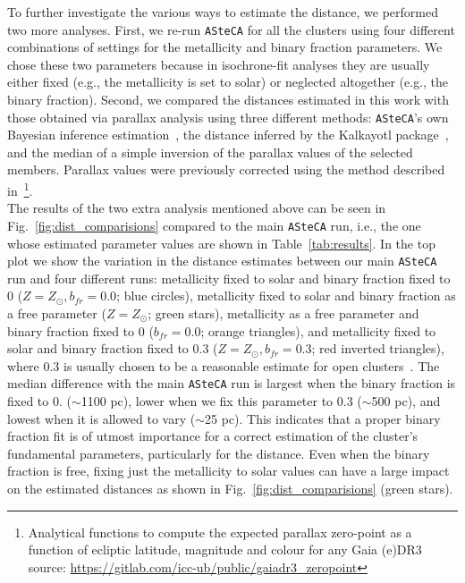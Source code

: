 \documentclass[draft]{aa}
\begin{document}
  To further investigate the various ways to estimate the distance, we performed
  two more analyses. First, we re-run \texttt{ASteCA} for all the
  clusters using four different combinations of settings for the metallicity and
  binary fraction parameters. We chose these two parameters because in
  isochrone-fit analyses they are usually either fixed (e.g., the metallicity is
  set to solar) or neglected altogether (e.g., the binary fraction).
  Second, we compared the distances estimated in this work with those obtained
  via parallax analysis using three different methods: \texttt{ASteCA}'s own
  Bayesian inference estimation~\citep[described in][]{Perren_2020}, the
  distance inferred by the Kalkayotl package~\citep{Kalkayotl}, and the median
  of a simple inversion of the parallax values of the selected members.
  Parallax values were previously corrected using the method described
  in~\cite{Lindegren_2021}\footnote{ Analytical functions to compute the
  expected parallax zero-point as a function of ecliptic latitude, magnitude and
  colour for any Gaia (e)DR3
  source: \url{https://gitlab.com/icc-ub/public/gaiadr3_zeropoint}}.\\

  The results of the two extra analysis mentioned above can be seen in
  Fig.~\ref{fig:dist_comparisions} compared to the main \texttt{ASteCA} run,
  i.e., the one whose estimated parameter values are shown in
  Table~\ref{tab:results}.
  In the top plot we show the variation in the distance estimates between our
  main \texttt{ASteCA} run and four different runs: metallicity fixed to solar
  and binary fraction fixed to 0 ($Z=Z_{\odot},b_{fr}=0.0$; blue circles),
  metallicity fixed to solar and binary fraction as a free parameter
  ($Z=Z_{\odot}$; green stars), metallicity as a free parameter and binary
  fraction fixed to 0 ($b_{fr}=0.0$; orange triangles), and metallicity fixed to
  solar and binary fraction fixed to 0.3 ($Z=Z_{\odot},b_{fr}=0.3$; red
  inverted triangles), where 0.3 is usually chosen to be a reasonable estimate
  for open clusters~\citep{Sollima_2010}. The median difference with the main
  \texttt{ASteCA} run is largest when the binary fraction is fixed to 0. 
  ($\sim$1100 pc), lower when we fix this parameter to 0.3 ($\sim$500 pc),
  and lowest when it is allowed to vary ($\sim$25 pc). This indicates that a
  proper binary fraction fit is of utmost importance for a correct estimation of
  the cluster's fundamental parameters, particularly for the distance. Even when
  the binary fraction is free, fixing just the metallicity to solar values can
  have a large impact on the estimated distances as shown in
  Fig.~\ref{fig:dist_comparisions} (green stars).
\end{document}
